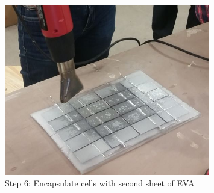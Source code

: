 \documentclass{article}
\theoremstyle{definition}
\theoremstyle{definition}
\theoremstyle{remark}
\begin{document}
\begin{figure}[!ht]
\begin{minipage}{0.25\textwidth}
        \includegraphics[width=0.8\textwidth]{../Images/image_3_9_(step_6).png}
        \caption*{Step 6: Encapsulate cells with second sheet of EVA}
    \end{minipage}
  \end{figure}
\end{document}
